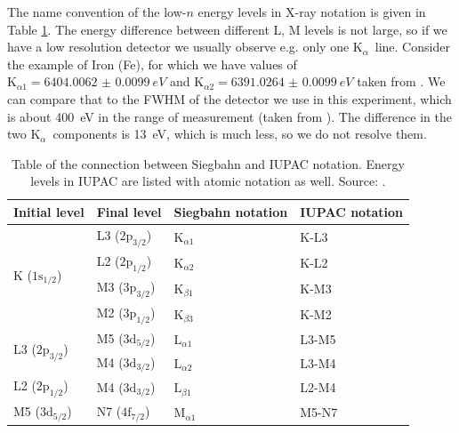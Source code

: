 \documentclass[11pt,a4paper,twoside,onecolumn]{article}
\newcommand{\Kalpha}{$\mathrm{K}_\alpha$~}
\begin{document}
The name convention of the low-$n$ energy levels in X-ray notation is given in Table \ref{tab:siegbahn-notation}. The energy difference between different L, M levels is not large, so if we have a low resolution detector we usually observe e.g. only one \Kalpha line. Consider the example of Iron (Fe), for which we have values of $\mathrm{K}_{\alpha 1} = \qty{6404.0062(99)}{eV}$ and $\mathrm{K}_{\alpha 2} = \qty{6391.0264(99)}{eV}$ taken from \cite{Hudson2003}. We can compare that to the FWHM of the detector we use in this experiment, which is about \qty{400}{eV} in the range of measurement (taken from \cite{xRayManual}). The difference in the two \Kalpha components is \qty{13}{eV}, which is much less, so we do not resolve them.
\begin{table}[!htbp]
    \centering
    \begin{tabular}{@{}llll@{}}
    \toprule
    \multicolumn{1}{c}{Initial level} & \multicolumn{1}{c}{Final level} & \multicolumn{1}{c}{Siegbahn notation} & \multicolumn{1}{c}{IUPAC notation} \\ \midrule
    \multirow{4}{*}{K ($1\mathrm{s}_{1/2}$)}  & L3 ($2\mathrm{p}_{3/2}$) & $\mathrm{K}_{\alpha 1}$ & K-L3  \\
                                              & L2 ($2\mathrm{p}_{1/2}$) & $\mathrm{K}_{\alpha 2}$ & K-L2  \\
                                              & M3 ($3\mathrm{p}_{3/2}$) & $\mathrm{K}_{\beta 1}$  & K-M3  \\
                                              & M2 ($3\mathrm{p}_{1/2}$) & $\mathrm{K}_{\beta 3}$  & K-M2  \\
    \multirow{2}{*}{L3 ($2\mathrm{p}_{3/2}$)} & M5 ($3\mathrm{d}_{5/2}$) & $\mathrm{L}_{\alpha 1}$ & L3-M5 \\
                                              & M4 ($3\mathrm{d}_{3/2}$) & $\mathrm{L}_{\alpha 2}$ & L3-M4 \\
    L2 ($2\mathrm{p}_{1/2}$)                  & M4 ($3\mathrm{d}_{3/2}$) & $\mathrm{L}_{\beta 1}$  & L2-M4 \\
    M5 ($3\mathrm{d}_{5/2}$)                  & N7 ($4\mathrm{f}_{7/2}$) & $\mathrm{M}_{\alpha 1}$ & M5-N7 \\ \bottomrule
    \end{tabular}
    \caption{Table of the connection between Siegbahn and IUPAC notation. Energy levels in IUPAC are listed with atomic notation as well. Source: \cite{Jenkins1991}.}
    \label{tab:siegbahn-notation}
\end{table}
\end{document}
